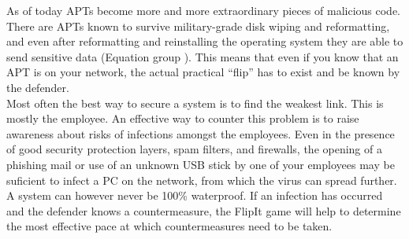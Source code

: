 As of today APTs become more and more extraordinary pieces of malicious code. There are APTs known to survive military-grade disk wiping and reformatting, and even after reformatting and reinstalling the operating system they are able to send sensitive data (Equation group \citep{Equation}). This means that even if you know that an APT is on your network, the actual practical ``flip'' has to exist and be known by the defender.  \\
Most often the best way to secure a system is to find the weakest link. This is mostly the employee. An effective way to counter this problem is to raise awareness about risks of infections amongst the employees.  Even in the presence of good security protection layers, spam filters, and firewalls, the opening of a phishing mail or use of an unknown USB stick by one of your employees may be suficient to infect a PC on the network, from which the virus can spread further. A system can however never be 100\% waterproof.  If an infection has occurred and the defender knows a countermeasure, the FlipIt game will help to determine the most effective pace at which countermeasures need to be taken.
